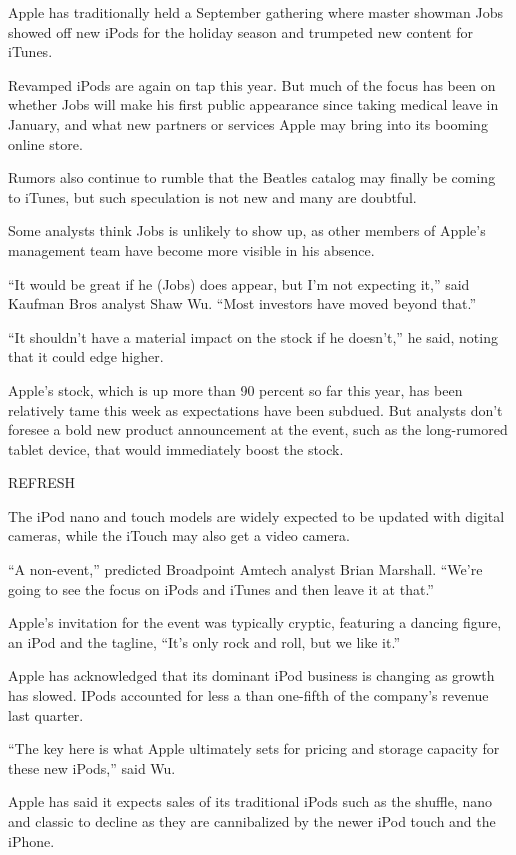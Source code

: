﻿\documentclass[12pt]{article}
\begin{document}
Apple has traditionally held a September gathering where master showman Jobs showed off new iPods
for the holiday season and trumpeted new content for iTunes.

Revamped\cite{revamp} iPods are again on tap this year. But much of the focus has been on whether
Jobs will make his first public appearance since taking medical leave in January, and what new
partners or services Apple may bring into its booming online store.

Rumors also continue to rumble that the Beatles catalog may finally be coming to iTunes, but such
speculation is not new and many are doubtful.

Some analysts think Jobs is unlikely to show up, as other members of Apple's management team have
become more visible in his absence.

``It would be great if he (Jobs) does appear, but I'm not expecting it,'' said Kaufman Bros analyst
Shaw Wu. ``Most investors have moved beyond that.''

``It shouldn't have a material impact on the stock if he doesn't,'' he said, noting that it could
edge higher.

Apple's stock, which is up more than 90 percent so far this year, has been relatively
tame\cite{tame} this week as expectations have been subdued. But analysts don't foresee a bold new
product announcement at the event, such as the long-rumored tablet device, that would immediately
boost the stock.

REFRESH

The iPod nano and touch models are widely expected to be updated with digital cameras, while the
iTouch may also get a video camera.

``A non-event,'' predicted Broadpoint Amtech analyst Brian Marshall. ``We're going to see the focus
on iPods and iTunes and then leave it at that.''

Apple's invitation for the event was typically cryptic, featuring a dancing figure, an iPod and the
tagline, ``It's only rock and roll, but we like it.''

Apple has acknowledged that its dominant iPod business is changing as growth has slowed. IPods
accounted for less a than one-fifth of the company's revenue last quarter.

``The key here is what Apple ultimately sets for pricing and storage capacity for these new iPods,''
said Wu.

Apple has said it expects sales of its traditional iPods such as the shuffle, nano and classic to
decline as they are cannibalized by the newer iPod touch and the iPhone.
\end{document}
